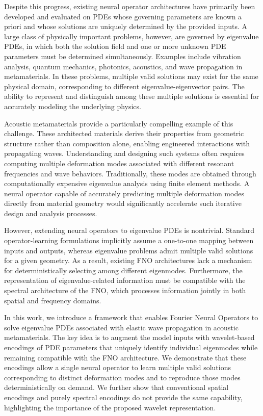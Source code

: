 \documentclass[preprint,review,12pt]{elsarticle}
\begin{document}
Despite this progress, existing neural operator architectures have primarily been developed and evaluated on PDEs whose governing parameters are known a priori and whose solutions are uniquely determined by the provided inputs. A large class of physically important problems, however, are governed by eigenvalue PDEs, in which both the solution field and one or more unknown PDE parameters must be determined simultaneously. Examples include vibration analysis, quantum mechanics, photonics, acoustics, and wave propagation in metamaterials.  In these problems, multiple valid solutions may exist for the same physical domain, corresponding to different eigenvalue-eigenvector pairs. The ability to represent and distinguish among these multiple solutions is essential for accurately modeling the underlying physics.

Acoustic metamaterials provide a particularly compelling example of this challenge. These architected materials derive their properties from geometric structure rather than composition alone, enabling engineered interactions with propagating waves.  Understanding and designing such systems often requires computing multiple deformation modes associated with different resonant frequencies and wave behaviors. Traditionally, these modes are obtained through computationally expensive eigenvalue analysis using finite element methods.  A neural operator capable of accurately predicting multiple deformation modes directly from material geometry would significantly accelerate such iterative design and analysis processes.

However, extending neural operators to eigenvalue PDEs is nontrivial. Standard operator-learning formulations implicitly assume a one-to-one mapping between inputs and outputs, whereas eigenvalue problems admit multiple valid solutions for a given geometry. As a result, existing FNO architectures lack a mechanism for deterministically selecting among different eigenmodes. Furthermore, the representation of eigenvalue-related information must be compatible with the spectral architecture of the FNO, which processes information jointly in both spatial and frequency domains.

In this work, we introduce a framework that enables Fourier Neural Operators to solve eigenvalue PDEs associated with elastic wave propagation in acoustic metamaterials. The key idea is to augment the model inputs with wavelet-based encodings of PDE parameters that uniquely identify individual eigenmodes while remaining compatible with the FNO architecture. We demonstrate that these encodings allow a single neural operator to learn multiple valid solutions corresponding to distinct deformation modes and to reproduce those modes deterministically on demand. We further show that conventional spatial encodings and purely spectral encodings do not provide the same capability, highlighting the importance of the proposed wavelet representation.
\end{document}

